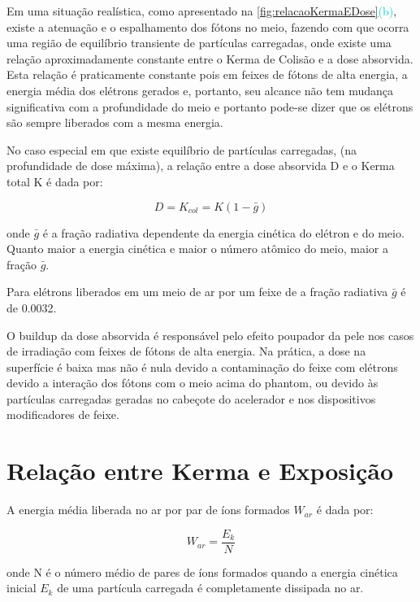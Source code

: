 \documentclass[11pt,a4paper]{article}
\newcounter{exemplo}
\begin{document}
		Em uma situação realística, como apresentado na   \ref{fig:relacaoKermaEDose}\textcolor{DarkTurquoise}{(b)}, existe a atenuação e o espalhamento dos fótons no meio, fazendo com que ocorra uma região de equilíbrio transiente de partículas carregadas, onde existe uma relação aproximadamente constante entre o Kerma de Colisão e a dose absorvida. Esta relação é praticamente constante pois em feixes de fótons de alta energia, a energia média dos elétrons gerados e, portanto, seu alcance não tem mudança significativa com a profundidade do meio e portanto pode-se dizer que os elétrons são sempre liberados com a mesma energia.

		No caso especial em que existe equilíbrio de partículas carregadas, (na profundidade de dose máxima), a relação entre a dose absorvida D e o Kerma total K é dada por:

			\begin{equation}
				D = K_{col} = K(1 - \bar{g})
			\end{equation}

		\noindent onde $\bar{g}$ é a fração radiativa dependente da energia cinética do elétron e do meio. Quanto maior a energia cinética e maior o número atômico do meio, maior a fração $\bar{g}$.

		\begin{exemplo}[Exemplo]
			Para elétrons liberados em um meio de ar por um feixe de  a fração radiativa $\bar{g}$ é de 0.0032.
		\end{exemplo}

		O buildup da dose absorvida é responsável pelo efeito poupador da pele nos casos de irradiação com feixes de fótons de alta energia. Na prática, a dose na superfície é baixa mas não é nula devido a contaminação do feixe com elétrons devido a interação dos fótons com o meio acima do phantom, ou devido às partículas carregadas geradas no cabeçote do acelerador e nos dispositivos modificadores de feixe.

	\section{Relação entre Kerma e Exposição}

		A energia média liberada no ar por par de íons formados $W_{ar}$ é dada por:

			\begin{equation}
				W_{ar} = \frac{E_k}{N}
			\end{equation}

		\noindent onde N é o número médio de pares de íons formados quando a energia cinética inicial $E_k$ de uma partícula carregada é completamente dissipada no ar.
\end{document}

